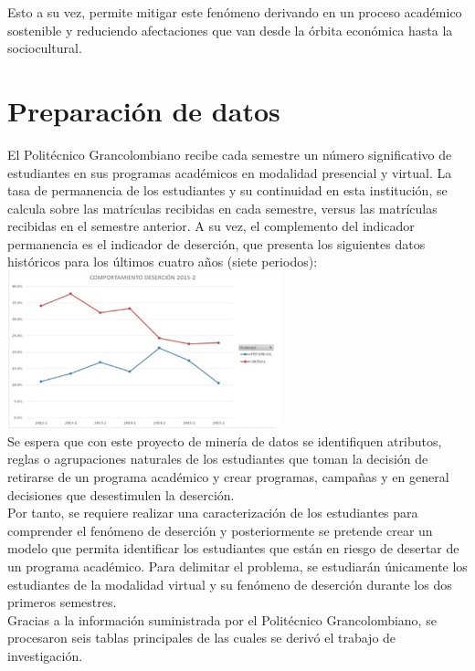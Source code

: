\documentclass[fleqn,10pt]{SelfArx} %
\begin{document}
Esto a su vez, permite mitigar este fenómeno derivando en un proceso académico sostenible y reduciendo afectaciones que van desde la órbita económica hasta la sociocultural.\\


\section{Preparación de datos}

El Politécnico Grancolombiano recibe cada semestre un número significativo de estudiantes en sus programas académicos en modalidad presencial y virtual. 
La tasa de permanencia de los estudiantes y su continuidad en esta institución, se calcula sobre las matrículas recibidas en cada semestre, versus las matrículas recibidas en el semestre anterior. A su vez, el complemento del indicador permanencia es el indicador de deserción, que presenta los siguientes datos históricos para los últimos cuatro años (siete periodos):  \\

\includegraphics[width=8cm]{img/estadistica.jpg}\\ 

Se espera que con este proyecto de minería de datos se identifiquen atributos, reglas o agrupaciones naturales de los estudiantes que toman la decisión de retirarse de un programa académico y crear programas, campañas y en general decisiones que desestimulen la deserción. \\

Por tanto, se requiere realizar una caracterización de los estudiantes para comprender el fenómeno de deserción y posteriormente se pretende crear un modelo que permita identificar los estudiantes que están en riesgo de desertar de un programa académico. Para delimitar el problema, se estudiarán únicamente los estudiantes de la modalidad virtual y su fenómeno de deserción durante los dos primeros semestres. \\
Gracias a la información suministrada por el Politécnico Grancolombiano, se procesaron seis tablas principales de las cuales se derivó el trabajo de investigación.\\
\end{document}
